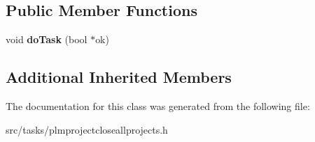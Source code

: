 \subsection*{Public Member Functions}
\begin{DoxyCompactItemize}
\item 
void {\bfseries do\+Task} (bool $\ast$ok)\hypertarget{class_p_l_m_project_close_all_projects_a47e3bc0cef4683806cddd7958305831d}{}\label{class_p_l_m_project_close_all_projects_a47e3bc0cef4683806cddd7958305831d}

\end{DoxyCompactItemize}
\subsection*{Additional Inherited Members}


The documentation for this class was generated from the following file\+:\begin{DoxyCompactItemize}
\item 
src/tasks/plmprojectcloseallprojects.\+h\end{DoxyCompactItemize}
